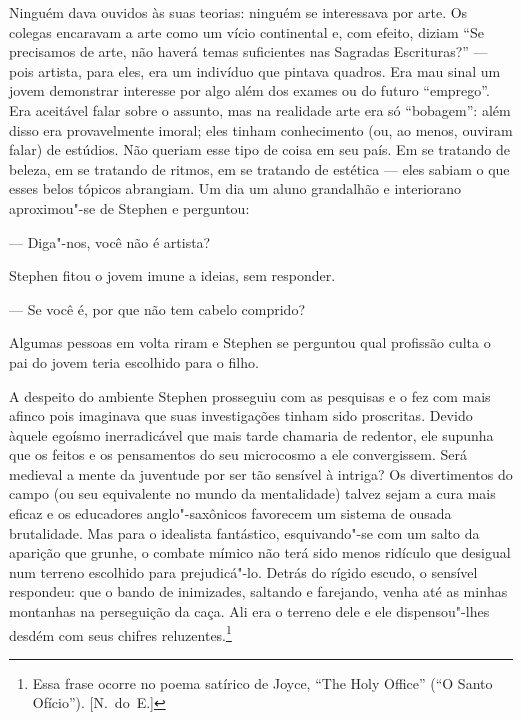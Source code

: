 Ninguém dava ouvidos às suas teorias: ninguém se interessava por
arte.  Os \label{colegas} colegas encaravam a arte como um vício continental e, com
efeito, diziam “Se precisamos de arte, não haverá temas suficientes nas
Sagradas Escrituras?” --- pois artista, para eles, era um indivíduo
que pintava quadros.  Era mau sinal um jovem demonstrar interesse por
algo além dos exames ou do futuro “emprego”.  Era aceitável falar sobre
o assunto, mas na realidade arte era só “bobagem”: além disso era
provavelmente imoral; eles tinham conhecimento (ou, ao menos, ouviram
falar) de estúdios.  Não queriam esse tipo de coisa em seu país.  Em se
tratando de beleza, em se tratando de ritmos, em se tratando de
estética --- eles sabiam o que esses belos tópicos abrangiam.  Um dia
um aluno grandalhão e interiorano aproximou"-se de Stephen e perguntou:

--- \label{diga"-nos} Diga"-nos, você não é artista?

Stephen fitou o jovem imune a ideias, sem responder.

--- Se você é, por que não tem cabelo comprido?

Algumas pessoas em volta riram e Stephen se perguntou qual profissão		
culta o pai do jovem teria escolhido para o filho.

A despeito do ambiente Stephen prosseguiu com as pesquisas e o fez
com mais afinco pois imaginava que suas investigações tinham sido
\label{proscritas} proscritas.  Devido àquele egoísmo inerradicável que mais tarde		
chamaria de redentor, ele supunha que os feitos e os pensamentos do seu
microcosmo a ele convergissem.  Será medieval a mente da juventude por
ser tão sensível à intriga?  Os divertimentos do campo (ou seu
equivalente no mundo da mentalidade) talvez sejam a cura mais eficaz e
os educadores anglo"-saxônicos favorecem um sistema de ousada
brutalidade.  Mas para o idealista fantástico, esquivando"-se com um
salto da aparição que grunhe, o combate mímico não terá sido menos
ridículo que desigual num terreno escolhido para prejudicá"-lo.  Detrás
do rígido escudo, o sensível respondeu: que o bando de inimizades,
saltando e farejando, venha até as minhas montanhas na perseguição da
caça.  Ali era o terreno dele e ele dispensou"-lhes desdém com seus
chifres reluzentes.\footnote{ Essa frase ocorre no poema satírico de
Joyce, “The Holy Office” (“O Santo Ofício”). [N.~do~E.]}		

